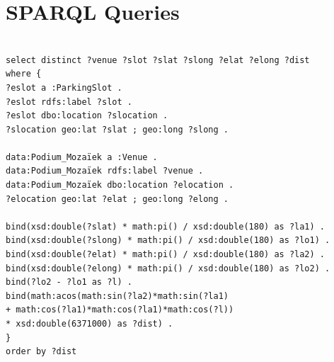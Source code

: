 \documentclass[runningheads,a4paper]{../../StyleFiles/llncs}
\begin{document}
\section{SPARQL Queries}

\begin{lstlisting}[captionpos=b, caption=SPARQL query for getting parking spots close to Podium Mozaiek (sorted by distance), label=lst:sparql,
basicstyle=\ttfamily,frame=bt]

select distinct ?venue ?slot ?slat ?slong ?elat ?elong ?dist
where {
?eslot a :ParkingSlot .
?eslot rdfs:label ?slot .
?eslot dbo:location ?slocation .
?slocation geo:lat ?slat ; geo:long ?slong .

data:Podium_Mozaïek a :Venue .
data:Podium_Mozaïek rdfs:label ?venue .
data:Podium_Mozaïek dbo:location ?elocation .
?elocation geo:lat ?elat ; geo:long ?elong .

bind(xsd:double(?slat) * math:pi() / xsd:double(180) as ?la1) .
bind(xsd:double(?slong) * math:pi() / xsd:double(180) as ?lo1) .
bind(xsd:double(?elat) * math:pi() / xsd:double(180) as ?la2) .
bind(xsd:double(?elong) * math:pi() / xsd:double(180) as ?lo2) .
bind(?lo2 - ?lo1 as ?l) .
bind(math:acos(math:sin(?la2)*math:sin(?la1) 
+ math:cos(?la1)*math:cos(?la1)*math:cos(?l)) 
* xsd:double(6371000) as ?dist) .
}
order by ?dist

\end{lstlisting}
\end{document}
